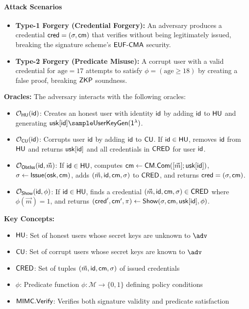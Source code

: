 \paragraph{Attack Scenarios}
\begin{itemize}
    \item \textbf{Type-1 Forgery (Credential Forgery):} An adversary produces a credential $\mathsf{cred} = (\sigma, \mathsf{cm})$ that verifies without being legitimately issued, breaking the signature scheme's $\mathsf{EUF\text{-}CMA}$ security.
    
    \item \textbf{Type-2 Forgery (Predicate Misuse):} A corrupt user with a valid credential for $\text{age} = 17$ attempts to satisfy $\phi=(\text{age} \geq 18)$ by creating a false proof, breaking $\mathsf{ZKP}$ soundness.
\end{itemize}

\noindent \textbf{Oracles:} The adversary interacts with the following oracles:

\begin{itemize}
    \item $\mathcal{O}_{\mathsf{HU}}(\mathsf{id})$: Creates an honest user with identity $\mathsf{id}$ by adding $\mathsf{id}$ to $\mathsf{HU}$ and generating $\usk[\id] \sample \UserKeyGen(\secparam)$.
    
    \item $\mathcal{O}_{\mathsf{CU}}(\mathsf{id})$: Corrupts user $\mathsf{id}$ by adding $\mathsf{id}$ to $\mathsf{CU}$. If $\mathsf{id} \in \mathsf{HU}$, removes $\mathsf{id}$ from $\mathsf{HU}$ and returns $\mathsf{usk}[\mathsf{id}]$ and all credentials in $\mathsf{CRED}$ for user $\mathsf{id}$.
    
    \item $\mathcal{O}_{\mathsf{ObtIss}}(\mathsf{id}, \vec{m})$: If $\mathsf{id} \in \mathsf{HU}$, computes $\mathsf{cm} \gets \mathsf{CM.Com}([\vec{m}]; \mathsf{usk}[\mathsf{id}])$, $\sigma \gets \mathsf{Issue}(\mathsf{osk}, \mathsf{cm})$, adds $(\vec{m}, \mathsf{id}, \mathsf{cm}, \sigma)$ to $\mathsf{CRED}$, and returns $\mathsf{cred} = (\sigma, \mathsf{cm})$.
    
    \item $\mathcal{O}_{\mathsf{Show}}(\mathsf{id}, \phi)$: If $\mathsf{id} \in \mathsf{HU}$, finds a credential $(\vec{m}, \mathsf{id}, \mathsf{cm}, \sigma) \in \mathsf{CRED}$ where $\phi(\vec{m}) = 1$, and returns $(\mathsf{cred}', \mathsf{cm}', \pi) \gets \mathsf{Show}(\sigma, \mathsf{cm}, \mathsf{usk}[\mathsf{id}], \phi)$.
\end{itemize}

\noindent \textbf{Key Concepts:}
\begin{itemize}
    \item $\mathsf{HU}$: Set of honest users whose secret keys are unknown to $\adv$
    \item $\mathsf{CU}$: Set of corrupt users whose secret keys are known to $\adv$
    \item $\mathsf{CRED}$: Set of tuples $(\vec{m}, \mathsf{id}, \mathsf{cm}, \sigma)$ of issued credentials
    \item $\phi$: Predicate function $\phi: \mathcal{M} \rightarrow \{0,1\}$ defining policy conditions
    \item $\mathsf{MIMC.Verify}$: Verifies both signature validity and predicate satisfaction
\end{itemize}








